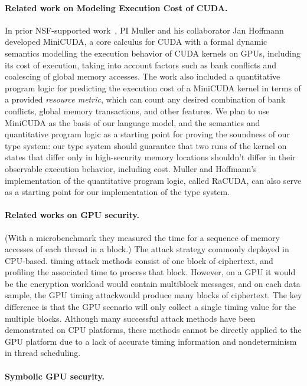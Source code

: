 \paragraph{Related work on Modeling Execution Cost of CUDA.}
In prior NSF-supported work~\citep{MullerHo21}, PI Muller and his collaborator Jan Hoffmann developed MiniCUDA, a core calculus for CUDA with a formal dynamic semantics modelling the execution behavior of CUDA kernels on GPUs, including its cost of execution, taking into account factors such as bank conflicts and coalescing of global memory accesses.
%
The work also included a quantitative program logic for predicting the execution cost of a MiniCUDA kernel in terms of a provided {\em resource metric}, which can count any desired combination of bank conflicts, global memory transactions, and other features.
%
We plan to use MiniCUDA as the basis of our language model, and the semantics and quantitative program logic as a starting point for proving the soundness of our type system: our type system should guarantee that two runs of the kernel on states that differ only in high-security memory locations shouldn't differ in their observable execution behavior, including cost.
%
Muller and Hoffmann's implementation of the quantitative program logic, called RaCUDA, can also serve as a starting point for our implementation of the type system.

\paragraph{Related works on GPU security.}
(With a microbenchmark they measured the
time for a sequence of memory accesses of each thread in a block.)
%
The attack strategy commonly deployed in CPU-based. timing attack methods consist of one block of ciphertext, and profiling the associated time to process that
block. However, on a GPU it would be the encryption workload would contain multiblock messages, and on each data sample, the GPU
timing attackwould produce many blocks of ciphertext.
The key difference is that the GPU scenario will only
collect a single timing value for the multiple blocks.
Although many successful attack methods have been
demonstrated on CPU platforms, these methods cannot be directly applied to the GPU platform due to a
lack of accurate timing information and nondeterminism in thread scheduling.

\paragraph{Symbolic GPU security.}


